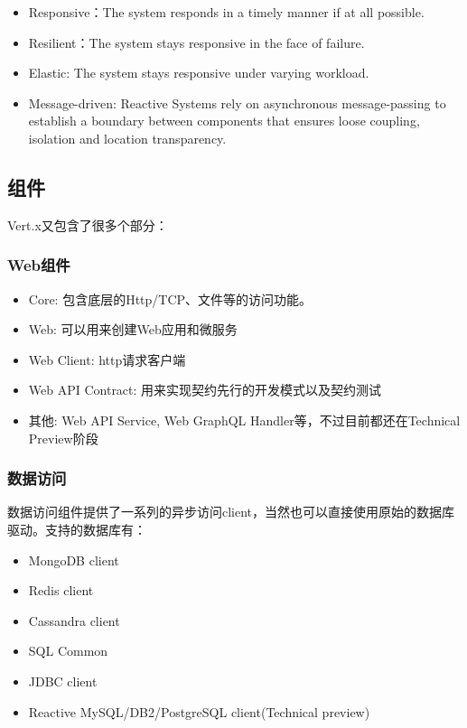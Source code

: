 \documentclass[12pt]{article}
\begin{document}
\begin{itemize}
\tightlist
\item
  Responsive：The system responds in a timely manner if at all possible.
\item
  Resilient：The system stays responsive in the face of failure.
\item
  Elastic: The system stays responsive under varying workload.
\item
  Message-driven: Reactive Systems rely on asynchronous message-passing to establish a boundary between components that ensures loose coupling, isolation and location transparency.
\end{itemize}

\subsection{组件}\label{ux7ec4ux4ef6}

Vert.x又包含了很多个部分：

\subsubsection{Web组件}\label{webux7ec4ux4ef6}

\begin{itemize}
\tightlist
\item
  Core: 包含底层的Http/TCP、文件等的访问功能。
\item
  Web: 可以用来创建Web应用和微服务
\item
  Web Client: http请求客户端
\item
  Web API Contract: 用来实现契约先行的开发模式以及契约测试
\item
  其他: Web API Service, Web GraphQL Handler等，不过目前都还在Technical Preview阶段
\end{itemize}

\subsubsection{数据访问}\label{ux6570ux636eux8bbfux95ee}

数据访问组件提供了一系列的异步访问client，当然也可以直接使用原始的数据库驱动。支持的数据库有：

\begin{itemize}
\tightlist
\item
  MongoDB client
\item
  Redis client
\item
  Cassandra client
\item
  SQL Common
\item
  JDBC client
\item
  Reactive MySQL/DB2/PostgreSQL client(Technical preview)
\end{itemize}
\end{document}
